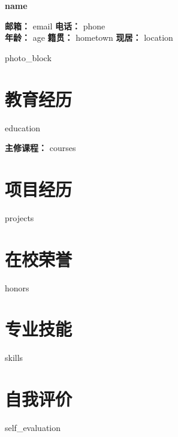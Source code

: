 \documentclass[11pt,a4paper]{article}
\newcommand{\infoitem}[2]{\textbf{\color{black}#1：}{\color{black}#2}}
\begin{document}
\begin{minipage}[c]{0.7\textwidth}
  {\LARGE\bfseries\color{sectioncolor} {{name}}}
  \vspace{6pt}

  \infoitem{邮箱}{ {{email}} } \quad
  \infoitem{电话}{ {{phone}} } \\[3pt]
  \infoitem{年龄}{ {{age}} } \quad
  \infoitem{籍贯}{ {{hometown}} } \quad
  \infoitem{现居}{ {{location}} }
\end{minipage}%
\hfill
{{photo_block}}

\color{linecolor}
\color{black}
\section{教育经历}
{{education}}

\vspace{2pt}
\infoitem{主修课程}{ {{courses}} }

\section{项目经历}
\begin{enumerate}[leftmargin=1.5em, itemsep=2pt]
{{projects}}
\end{enumerate}

\section{在校荣誉}
{{honors}}

\section{专业技能}
\begin{itemize}[nosep, leftmargin=1.5em]
{{skills}}
\end{itemize}

\section{自我评价}
{{self_evaluation}}
\end{document}
